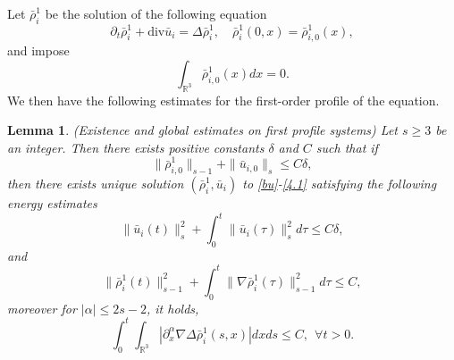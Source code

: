 \documentclass[reqno,twoside,12pt,a4paper]{amsart}
\newcommand{\al}{\alpha}
\newcommand{\dive}{\mathrm{div}}
\newcommand{\pt}{\partial_t}
\newcommand{\pa}{\partial}
\newcommand{\D}{\nabla}
\newtheorem{lemma}{Lemma}[section]
\numberwithin{equation}{section}
\begin{document}
Let $\bar{\rho}_i^1$ be the solution of the following equation
\begin{equation}\label{4.1}
    \pt \bar{\rho}_i^1+\dive \bar{u}_i=\Delta \bar{\rho}_i^1, \quad \bar{\rho}_i^1(0,x)=\bar{\rho}_{i,0}^1(x),
\end{equation}
and impose \begin{equation} \int_{\mathbb{R}^3} \bar{\rho}_{i,0}^1(x) dx=0.\end{equation}
We then have the following estimates for the first-order profile of the equation.
\begin{lemma}\label{regurhoi1} (Existence and global estimates on first profile systems) Let $s\geq 3$ be an integer. Then there exists positive constants $\delta$ and $C$ such that if
\[
\|\bar{\rho}_{i,0}^1\|_{s-1}+\|\bar{u}_{i,0}\|_s\leq C\delta,
\]
then there exists unique solution $(\bar{\rho}_i^1,\bar{u}_i)$ to \eqref{bu}-\eqref{4.1} satisfying the following energy estimates
\begin{equation}
\|\bar{u}_i(t)\|_s^2+\int_0^t \|\bar{u}_i(\tau)\|_s^2 d\tau \leq C\delta,
\end{equation}
and
\begin{equation}
\|\bar{\rho}_i^1(t)\|_{s-1}^2+\int_0^t \|\D \bar{\rho}_i^1(\tau)\|_{s-1}^2 d\tau \leq C,
\end{equation}
moreover for $|\al| \leq 2s-2$, it holds,
\begin{equation}
    \int_0^t \int_{\mathbb{R}^3} |\pa^\al_x \D \Delta \bar{\rho}_i^1(s,x)| dx ds \leq C , \  \ \forall t>0.
\end{equation}

\end{lemma}
\end{document}
